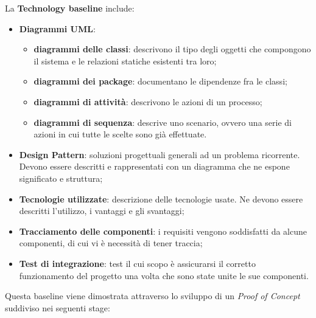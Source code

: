 La \textbf{Technology baseline} include:
\begin{itemize}
\item \textbf{Diagrammi UML}:
\begin{itemize}
\item \textbf{diagrammi delle classi}: descrivono il tipo degli oggetti che compongono il sistema e le relazioni statiche esistenti tra loro;
\item \textbf{diagrammi dei package}: documentano le dipendenze fra le classi;
\item \textbf{diagrammi di attività}: descrivono le azioni di un processo;
\item \textbf{diagrammi di sequenza}: descrive uno scenario, ovvero una serie di azioni in cui tutte le scelte sono già effettuate.
\end{itemize}
\item \textbf{Design Pattern}: soluzioni progettuali generali ad un problema ricorrente. Devono essere descritti e rappresentati con un diagramma che ne espone significato e struttura;
\item \textbf{Tecnologie utilizzate}: descrizione delle tecnologie usate. Ne devono essere descritti l'utilizzo, i vantaggi e gli svantaggi;
\item \textbf{Tracciamento delle componenti}: i requisiti vengono soddisfatti da alcune componenti, di cui vi è necessità di tener traccia;
\item \textbf{Test di integrazione}: test il cui scopo è assicurarsi il corretto funzionamento del progetto una volta che sono state unite le sue componenti.
\end{itemize}
Questa baseline viene dimostrata attraverso lo sviluppo di un \textit{Proof of Concept} suddiviso nei seguenti stage:
